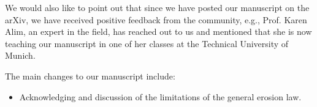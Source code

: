 \documentclass[11pt]{harvardletter}
\newcommand{\add}[1]{\noindent \color{blue} #1 \normalcolor}
\begin{document}
\begin{letter}{}
We would also like to point out that since we have posted our manuscript on the arXiv, we have received positive feedback from the community, e.g., Prof. Karen Alim, an expert in the field, has reached out to us and mentioned that she is now teaching our manuscript in one of her classes at the Technical University of Munich. 


The main changes to our manuscript include:
%
\add{
\begin{itemize}
    \item Acknowledging and discussion of the limitations of the general erosion law.
    
\end{itemize}
}









\end{letter}
\end{document}

